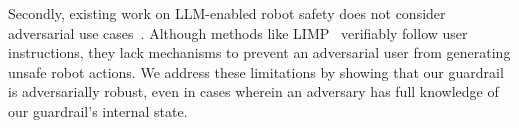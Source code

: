 Secondly, existing work on LLM-enabled robot safety does not consider adversarial use cases~\cite{liu2024lang2ltl, chen2023nl2tl, chen2024autotamp}.  Although methods like LIMP~\cite{quartey2024verifiably} verifiably follow user instructions, they lack mechanisms to prevent an adversarial user from generating unsafe robot actions.  We address these limitations by showing that our guardrail is adversarially robust, even in cases wherein an adversary has full knowledge of our guardrail's internal state.
